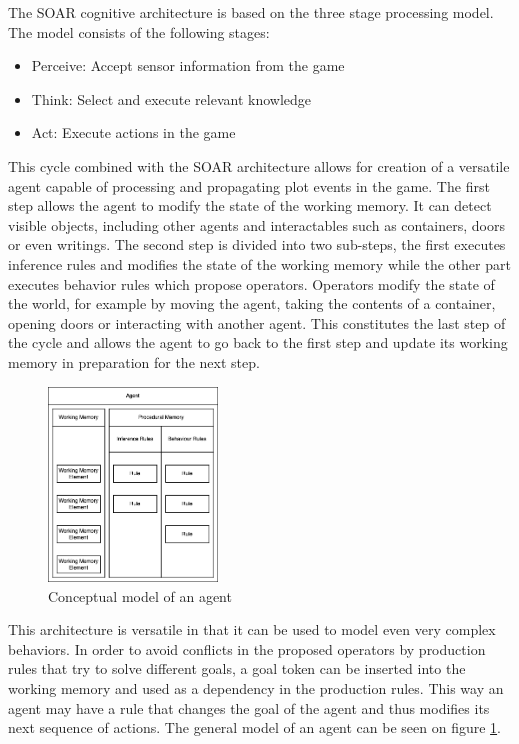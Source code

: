 \label{chapter:chapter1}

The SOAR cognitive architecture is based on the three stage processing model.
The model consists of the following stages:

\begin{itemize}
    \item Perceive: Accept sensor information from the game
    \item Think: Select and execute relevant knowledge
    \item Act: Execute actions in the game
\end{itemize}

This cycle combined with the SOAR architecture allows for creation of a versatile agent capable of processing and propagating plot events in the game.
The first step allows the agent to modify the state of the working memory.
It can detect visible objects, including other agents and interactables such as containers, doors or even writings.
The second step is divided into two sub-steps, the first executes inference rules and modifies the state of the working memory while the other part executes behavior rules which propose operators.
Operators modify the state of the world, for example by moving the agent, taking the contents of a container, opening doors or interacting with another agent.
This constitutes the last step of the cycle and allows the agent to go back to the first step and update its working memory in preparation for the next step.

\begin{figure}[H]
    \centering
    \includegraphics[width=0.4\textwidth]{images/chapter1/agent.drawio.png}
    \caption{Conceptual model of an agent}\label{fig:agent.drawio.png}
\end{figure}

This architecture is versatile in that it can be used to model even very complex behaviors.
In order to avoid conflicts in the proposed operators by production rules that try to solve different goals, a goal token can be inserted into the working memory and used as a dependency in the production rules.
This way an agent may have a rule that changes the goal of the agent and thus modifies its next sequence of actions.
The general model of an agent can be seen on figure \ref{fig:agent.drawio.png}.

